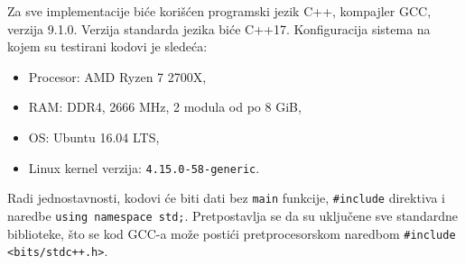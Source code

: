 Za sve implementacije bi\' ce kori\v s\' cen programski jezik C++, kompajler GCC, verzija 9.1.0. Verzija standarda jezika bi\' ce C++17. Konfiguracija sistema na kojem su testirani kodovi je slede\' ca:

\begin{itemize}
    \item Procesor: AMD Ryzen 7 2700X,
    \item RAM: DDR4, 2666 MHz, 2 modula od po 8 GiB,
    \item OS: Ubuntu 16.04 LTS,
    \item Linux kernel verzija: \texttt{4.15.0-58-generic}.
\end{itemize}

Radi jednostavnosti, kodovi \' ce biti dati bez \texttt{main} funkcije, \texttt{\#include} direktiva i naredbe \texttt{using namespace std;}. Pretpostavlja se da su uklju\v cene sve standardne biblioteke, \v sto se kod GCC-a mo\v ze posti\' ci pretprocesorskom naredbom \texttt{\#include <bits/stdc++.h>}.